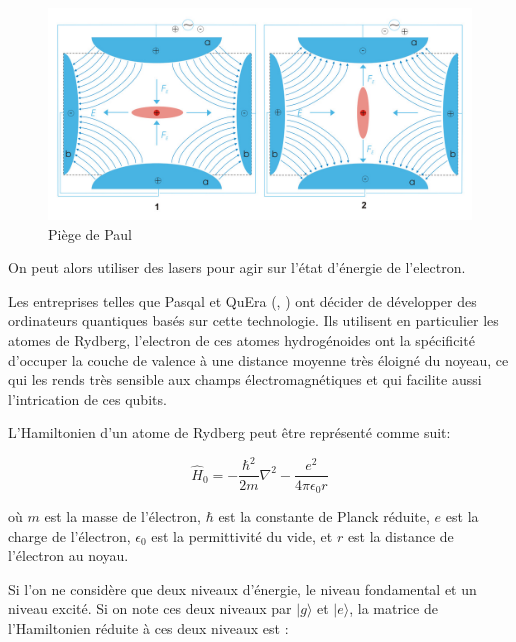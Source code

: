 \documentclass{article}
\begin{document}
\begin{multicols}{2}
\begin{figure}[H]
    \centering
    \includegraphics[width = \columnwidth]{fig/Paul-Trap.png}
    \caption{Piège de Paul}
    \label{fig:Paul_Trap}
\end{figure}


On peut alors utiliser des lasers pour agir sur l'état d'énergie de l'electron.

Les entreprises telles que Pasqal et QuEra (\cite{wintersperger_neutral_2023}, \cite{noauthor_building_nodate}) ont décider de développer des ordinateurs quantiques basés sur cette technologie.
Ils utilisent en particulier les atomes de Rydberg, l'electron de ces atomes hydrogénoides ont la spécificité d'occuper la couche de valence à une distance moyenne très éloigné du noyeau, ce qui les rends très sensible aux champs électromagnétiques et qui facilite aussi l'intrication de ces qubits.


L'Hamiltonien d'un atome de Rydberg peut être représenté comme suit:

$$
\hat{H}_0 = -\frac{\hbar^2}{2m}\nabla^2 - \frac{e^2}{4\pi\epsilon_0 r}
$$

où $m$ est la masse de l'électron, $\hbar$ est la constante de Planck réduite, $e$ est la charge de l'électron, $\epsilon_0$ est la permittivité du vide, et $r$ est la distance de l'électron au noyau.

Si l'on ne considère que deux niveaux d'énergie, le niveau fondamental et un niveau excité. Si on note ces deux niveaux par $|g\rangle$ et $|e\rangle$, la matrice de l'Hamiltonien réduite à ces deux niveaux est :


\end{multicols}
\end{document}
